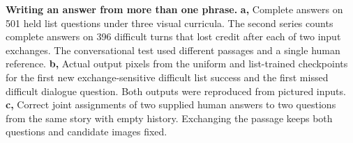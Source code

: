 \textbf{Writing an answer from more than one phrase.} \textbf{a,} Complete answers on 501 held list questions under three visual curricula. The second series counts complete answers on 396 difficult turns that lost credit after each of two input exchanges. The conversational test used different passages and a single human reference. \textbf{b,} Actual output pixels from the uniform and list-trained checkpoints for the first new exchange-sensitive difficult list success and the first missed difficult dialogue question. Both outputs were reproduced from pictured inputs. \textbf{c,} Correct joint assignments of two supplied human answers to two questions from the same story with empty history. Exchanging the passage keeps both questions and candidate images fixed.
